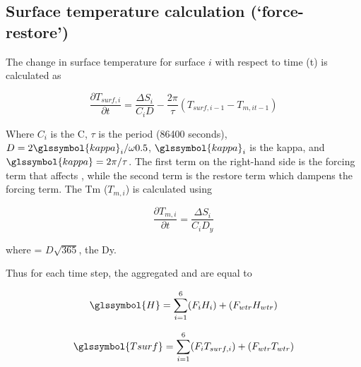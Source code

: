 \documentclass[final,3p,times,authoryear]{elsarticle}
\begin{document}
\subsection{Surface temperature calculation (`force-restore')}\label{sec:tsurf}

The change in surface temperature  for surface $i$ with respect to time (t) is calculated as


\begin{equation} 
\frac{\partial T_{surf,i}}{\partial t}= \frac{\Delta S_{i}}{C_{i} D} - \frac{2 \pi}{\tau} (T_{surf,i -1} - T_{m,it-1})
\label{eq:force} \end{equation} 


Where $C_{i}$ is the \glsdesc{C}, $\tau$ is the period (86400 seconds), $D = 2 \glssymbol{kappa} _{i}  / \omega 0.5$, $\glssymbol{kappa} _{i}$ is the \glsdesc{kappa}, and $\glssymbol{kappa} = 2\pi / \tau$.  The first term on the right-hand side is the forcing term that affects , while the second term is the restore term which dampens the forcing term. The \glsdesc{Tm} ($T_{m,i}$) is calculated using



\begin{equation} 
\frac{\partial T_{m,i}}{\partial t} = \frac{\Delta S_{i}}{C_{i} D_{y}}
\label{eq:tm} \end{equation} 

where  = $D \sqrt{365}$, the \glsdesc{Dy}. 

Thus for each time step, the aggregated  and  are equal to

\begin{equation} 
\glssymbol{H} = \sum_{i=1}^{6} (F_{i} H_{i}) + (F_{wtr} H_{wtr})
\label{eq:H} \end{equation} 

\begin{equation} 
\glssymbol{Tsurf} = \sum_{i=1}^{6} (F_{i} T_{surf,i}) + (F_{wtr} T_{wtr})
\label{eq:tsurf} \end{equation} 
\end{document}
